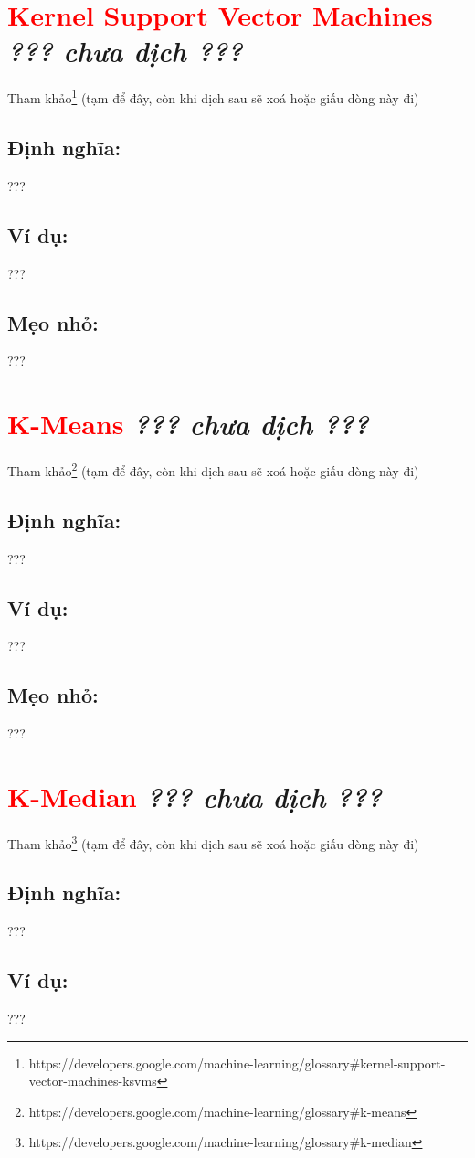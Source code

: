 \section*{\huge \textcolor{Red}{Kernel Support Vector Machines}  \small \textit{??? chưa dịch ???} }
Tham khảo\footnote{https://developers.google.com/machine-learning/glossary\#kernel-support-vector-machines-ksvms} (tạm để đây, còn khi dịch sau sẽ xoá hoặc giấu dòng này đi)
\subsection*{Định nghĩa:}
???
\subsection*{Ví dụ:}
???
\subsection*{Mẹo nhỏ:}
???
\section*{\huge \textcolor{Red}{K-Means}  \small \textit{??? chưa dịch ???} }
Tham khảo\footnote{https://developers.google.com/machine-learning/glossary\#k-means} (tạm để đây, còn khi dịch sau sẽ xoá hoặc giấu dòng này đi)
\subsection*{Định nghĩa:}
???
\subsection*{Ví dụ:}
???
\subsection*{Mẹo nhỏ:}
???
\section*{\huge \textcolor{Red}{K-Median}  \small \textit{??? chưa dịch ???} }
Tham khảo\footnote{https://developers.google.com/machine-learning/glossary\#k-median} (tạm để đây, còn khi dịch sau sẽ xoá hoặc giấu dòng này đi)
\subsection*{Định nghĩa:}
???
\subsection*{Ví dụ:}
???
